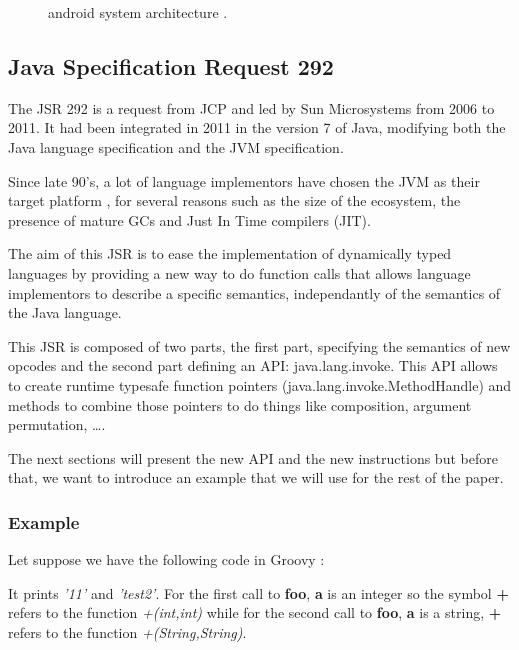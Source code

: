 \documentclass{sig-alternate}
\def \JCP{JCP\xspace}
\def \SUN{Sun Microsystems\xspace}
\def \Jsr{JSR\xspace}
\def \JSR{\Jsr 292\xspace}
\def \JVM{JVM\xspace}
\begin{document}
    \begin{figure}[!h]
      \centering \resizebox{\linewidth}{!}{}
      \caption{android system architecture \cite{wiki-android}.}
      \label{ASA}
    \end{figure}

  \subsection{Java Specification Request 292}

    The \JSR is a request from \JCP and led by \SUN from 2006 to 2011.
    It had been integrated in 2011 in the version 7 of Java,
    modifying both the Java language specification and the \JVM specification.

    Since late 90's, a lot of language
    implementors have chosen the JVM as their target platform \cite{wiki-jvm-lang},
    for several reasons such as the size of the ecosystem,
    the presence of mature GCs and Just In Time compilers (JIT).

    The aim of this \Jsr is to ease the implementation of dynamically typed languages
    by providing a new way to do function calls that allows language implementors
    to describe a specific semantics, independantly of the semantics of the Java language.

    This \Jsr is composed of two parts, the first part, specifying the semantics of
    new opcodes and the second part defining an API: java.lang.invoke.
    This API allows to create runtime typesafe function pointers (java.lang.invoke.MethodHandle)
    and methods to combine those pointers to do things like composition, argument permutation, \dots.

    The next sections will present the new API and the new instructions but before that,
    we want to introduce an example that we will use for the rest of the paper.

    \subsubsection{Example}
      Let suppose we have the following code in Groovy \cite{lang-groovy}:

      

      It prints {\it '11'} and {\it 'test2'}.
      For the first call to {\bf foo}, {\bf a} is an integer so the symbol {\bf +} refers
      to the function {\it +(int,int)} while for the second call to {\bf foo}, {\bf a} is a string, {\bf +} refers to the function {\it +(String,String)}.
\end{document}
